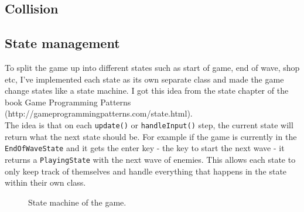 \documentclass{article}
\newcommand{\n}[0]{\\[\baselineskip]}
\begin{document}
\subsection{Collision}
 

\subsection{State management}
To split the game up into different states such as start of game, end of wave, shop etc, I've implemented each state as its own separate class and made the game change states like a state machine. I got this idea from the state chapter of the book Game Programming Patterns (http://gameprogrammingpatterns.com/state.html).
\n
The idea is that on each \texttt{update()} or \texttt{handleInput()} step, the current state will return what the next state should be. For example if the game is currently in the \texttt{EndOfWaveState} and it gets the enter key - the key to start the next wave - it returns a \texttt{PlayingState} with the next wave of enemies. This allows each state to only keep track of themselves and handle everything that happens in the state within their own class. 
\n
\begin{figure}[H]
\caption{State machine of the game.}
\end{figure}
\printbibliography
\end{document}
